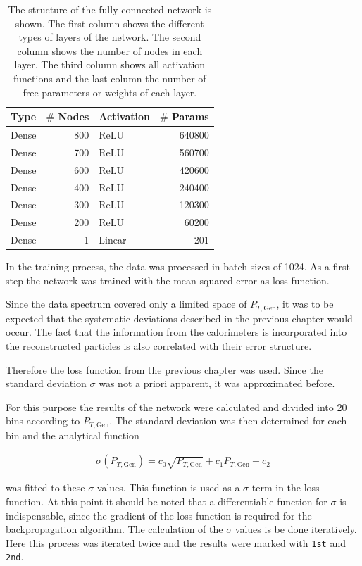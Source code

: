 \documentclass[12pt, a4paper]{thesis}
\begin{document}
\begin{table}[H]
  \centering
  \begin{tabular}{lrlr}
    Type & \(\#\) Nodes & Activation & \(\#\) Params\\
    \hline
    Dense & 800 & ReLU & 640800\\
    Dense & 700 & ReLU & 560700\\
    Dense & 600 & ReLU & 420600\\
    Dense & 400 & ReLU & 240400\\
    Dense & 300 & ReLU & 120300\\
    Dense & 200 & ReLU & 60200\\
    Dense & 1 & Linear & 201\\
  \end{tabular}
  \caption{The structure of the fully connected network is shown. The
    first column shows the different types of layers of the
    network. The second column shows the number of nodes in each
    layer. The third column shows all activation functions and the
    last column the number of free parameters or weights of each
    layer.}
  \label{jet_fcn_structure}
\end{table}

In the training process, the data was processed in batch sizes of
1024. As a first step the network was trained with the mean squared
error as loss function.

Since the data spectrum covered only a limited space of \(P_{T,
  \text{Gen}}\), it was to be expected that the systematic deviations
described in the previous chapter would occur. The fact that the
information from the calorimeters is incorporated into the
reconstructed particles is also correlated with their error structure.

Therefore the loss function from the previous chapter was used. Since
the standard deviation \(\sigma\) was not a priori apparent, it was
approximated before.

For this purpose the results of the network were calculated and
divided into 20 bins according to \(P_{T, \text{Gen}}\). The standard deviation
was then determined for each bin and the analytical function 

\begin{align}
\sigma(P_{T, \text{Gen}})= c_0 \sqrt{P_{T, \text{Gen}}}+c_1 P_{T, \text{Gen}} + c_2
\end{align}

was fitted to these \(\sigma\) values. This function is used as a
\(\sigma\) term in the loss function. At this point it should be noted
that a differentiable function for \(\sigma\) is indispensable, since
the gradient of the loss function is required for the backpropagation
algorithm.  The calculation of the \(\sigma\) values is be done
iteratively. Here this process was iterated twice and the results were
marked with \texttt{1st} and \texttt{2nd}.
\end{document}
